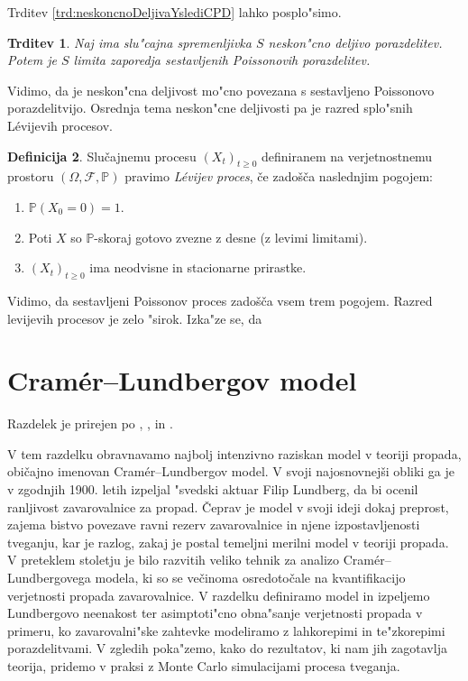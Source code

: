 \documentclass[12pt, a4paper, reqno]{amsart}
\theoremstyle{definition}
\newtheorem{definicija}{Definicija}[section]
\theoremstyle{plain}
\newtheorem{trditev}[definicija]{Trditev}
\newcommand{\Prob}{\mathbb{P}}
\newcommand{\1}{\mathds{1}}
\begin{document}
    Trditev \ref{trd:neskoncnoDeljivaYslediCPD} lahko posplo"simo. 

    \begin{trditev}
        Naj ima slu"cajna spremenljivka $S$ neskon"cno deljivo porazdelitev. Potem je $S$ limita 
        zaporedja sestavljenih Poissonovih porazdelitev.
    \end{trditev}

    Vidimo, da je neskon"cna deljivost mo"cno povezana s sestavljeno Poissonovo porazdelitvijo. Osrednja
    tema neskon"cne deljivosti pa je razred splo"snih Lévijevih procesov. 

    \begin{definicija}
        Slučajnemu procesu $(X_t)_{t\geq0}$ definiranem na verjetnostnemu
        prostoru $(\Omega, \mathcal{F}, \Prob)$ pravimo \textit{Lévijev proces}, če zadošča naslednjim pogojem:
        \begin{enumerate}
            \item $\Prob(X_0 = 0)=1$.
            \item Poti $X$ so $\Prob$-skoraj gotovo zvezne z desne (z levimi limitami).
            \item $(X_t)_{t\geq0}$ ima neodvisne in stacionarne prirastke.
        \end{enumerate}
    \end{definicija}

    Vidimo, da sestavljeni Poissonov proces zadošča vsem trem pogojem. Razred levijevih procesov 
    je zelo "sirok. Izka"ze se, da 

    \pagebreak

\section{Cramér--Lundbergov model}
    \noindent
    Razdelek je prirejen po \cite{3}, \cite{4},  \cite{5} in \cite{9}.

    V tem razdelku obravnavamo najbolj intenzivno raziskan model v teoriji propada, običajno imenovan 
    Cramér--Lundbergov model. V svoji najosnovnejši obliki 
    ga je v zgodnjih 1900. letih izpeljal "svedski aktuar Filip Lundberg, da bi ocenil ranljivost 
    zavarovalnice za propad. Čeprav je model v svoji ideji dokaj preprost, 
     zajema bistvo povezave ravni rezerv zavarovalnice in njene izpostavljenosti tveganju, 
    kar je razlog, zakaj je postal temeljni merilni model v teoriji propada.
    V preteklem stoletju je bilo razvitih veliko tehnik za analizo Cramér--Lundbergovega modela, 
    ki so se večinoma osredotočale na kvantifikacijo verjetnosti propada zavarovalnice. V razdelku definiramo 
    model in izpeljemo Lundbergovo neenakost ter asimptoti"cno obna"sanje verjetnosti propada v primeru, ko 
    zavarovalni"ske zahtevke modeliramo z lahkorepimi in te"zkorepimi porazdelitvami. V zgledih 
    poka"zemo, kako do rezultatov, ki nam jih zagotavlja teorija, pridemo v praksi z Monte Carlo 
    simulacijami procesa tveganja.
\end{document}
